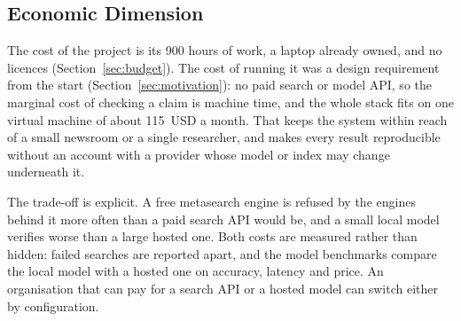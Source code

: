 
\subsection{Economic Dimension}

The cost of the project is its 900 hours of work, a laptop already
owned, and no licences (Section~\ref{sec:budget}). The cost of running
it was a design requirement from the start (Section~\ref{sec:motivation}):
no paid search or model API, so the marginal cost of checking a claim
is machine time, and the whole stack fits on one virtual machine of
about 115~USD a month. That keeps the system within reach of a small
newsroom or a single researcher, and makes every result reproducible
without an account with a provider whose model or index may change
underneath it.

The trade-off is explicit. A free metasearch engine is refused by the
engines behind it more often than a paid search API would be, and a
small local model verifies worse than a large hosted one. Both costs
are measured rather than hidden: failed searches are reported apart,
and the model benchmarks compare the local model with a hosted one on
accuracy, latency and price. An organisation that can pay for a search
API or a hosted model can switch either by configuration.
